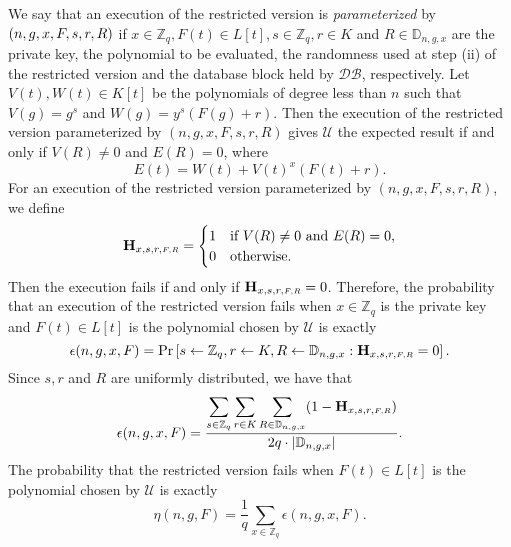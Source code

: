 \documentclass[JMC]{degruyter-journal}
\begin{document}
We say that an execution of the restricted version  is {\em parameterized} by
$(n,g,x,F,\\s,r,R)$ if $x\in \mathbb{Z}_q, F(t)\in L[t], s\in
\mathbb{Z}_q, r\in K$ and $R\in \mathbb{D}_{n,g,x}$ are the private
key, the polynomial to be evaluated,  the randomness used at step (ii) of the restricted version 
and  the database block held by $\mathcal{DB}$,  respectively.
 Let $V(t), W(t)\in K[t]$ be the polynomials of degree less than $n$
such that $V(g)=g^s$ and $W(g)=y^s(F(g)+r)$. Then  the
execution of the restricted version  parameterized by $(n,g,x,F,s,r,R)$ gives
$\mathcal{U}$ the expected result {if and only if} $V(R)\neq 0$ and
$E(R)=0$, where
\begin{equation}\label{eqn:Q_t}
E(t)=W(t)+V(t)^x(F(t)+r).
\end{equation}
For an  execution of  the restricted version   parameterized by
$(n,g,x,F,s,r,R)$,  we define
\begin{equation*}\label{eqn:H_xsrFR}
{\bf H}_{x,s,r,{\scriptscriptstyle  F, R}}=
\begin{cases}
1 & \text{if $V(R)\neq 0$ and $E(R)=0$,}
\\
0 &\text{otherwise.}
\end{cases}
\end{equation*}
Then the execution  fails if and only if ${\bf H}_{x,s,r,{\scriptscriptstyle  F,
R}}=0$. Therefore, the probability that an execution of the restricted version
fails when $x\in \mathbb{Z}_q$ is the private key and  $F(t)\in
L[t]$  is the polynomial
 chosen by $\mathcal{U}$ is exactly
\begin{equation*}\label{eqn:epsilon}
\epsilon(n,g,x,F)=\Pr\left[s\leftarrow \mathbb{Z}_q, r\leftarrow  K, R\leftarrow
\mathbb{D}_{n,g,x}: {\bf H}_{x,s,r,{\scriptscriptstyle  F, R}}=0\right].
\end{equation*}
Since $s,r$ and $R$ are uniformly distributed, we have that
\begin{equation}\label{eqn:epsilon}
\epsilon(n,g,x,F)=\frac{\displaystyle\sum_{s\in
\mathbb{Z}_q}\sum_{r\in K} \sum_{R \in \mathbb{D}_{n,g,x}} (1-{\bf
H}_{x,s,r,{\scriptscriptstyle  F,R}})}{2q\cdot  |\mathbb{D}_{n,g,x}|}.
\end{equation}
The probability that the restricted version   fails when $F(t)\in L[t]$ is the
polynomial
 chosen by $\mathcal{U}$
is exactly
\begin{equation}\label{eqn:eta}
\eta(n,g,F)=\frac{1}{q} \sum_{x\in \mathbb{Z}_q}\epsilon(n,g,x,F).
\end{equation}
\end{document}
